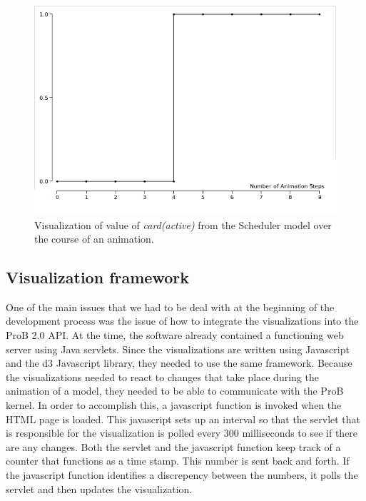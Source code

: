 \begin{figure}[h!]
\centering
\includegraphics[width=15cm]{bilder/timeVsValue.png}
\caption{Visualization of value of \emph{card(active)} from the Scheduler model over the course of an animation.}
\label{timeVsValue}
\end{figure}

\subsection{Visualization framework}

One of the main issues that we had to be deal with at the beginning of the development process was the issue of how to integrate the visualizations into the ProB 2.0 API. At the time, the software already contained a functioning web server using Java servlets. Since the visualizations are written using Javascript and the d3 Javascript library, they needed to use the same framework. Because the visualizations needed to react to changes that take place during the animation of a model, they needed to be able to communicate with the ProB kernel. In order to accomplish this, a javascript function is invoked when the HTML page is loaded. This javascript sets up an interval so that the servlet that is responsible for the visualization is polled every 300 milliseconds to see if there are any changes. Both the servlet and the javascript function keep track of a counter that functions as a time stamp. This number is sent back and forth. If the javascript function identifies a discrepency between the numbers, it polls the servlet and then updates the visualization.

